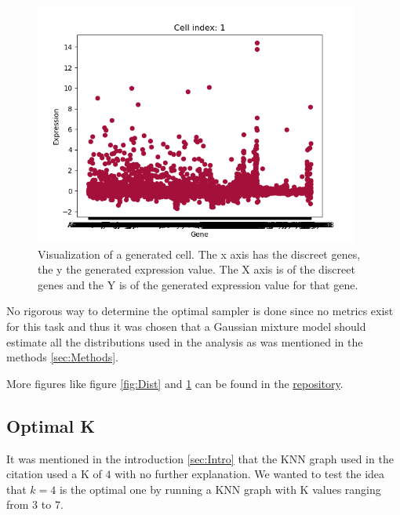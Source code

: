 \documentclass[12pt, a4paper]{article}
\begin{document}
                    \begin{figure}[H]
                        \begin{center}
                            \includegraphics[width=0.95\textwidth]{./outputs/Generator/Cells/Cell 1.png}
                        \end{center}
                        \caption{Visualization of a generated cell. The x axis has the discreet genes, the y the generated expression value. The X axis is of the discreet genes and the Y is of the generated expression value for that gene.}\label{fig:cells}
                    \end{figure}

                \begin{multicols}{2}

                No rigorous way to determine the optimal sampler is done since no metrics exist for this task and thus it was chosen that a Gaussian mixture model should estimate all the distributions used in the analysis as was mentioned in the methods \ref{sec:Methods}.
                \newline

                More figures like figure \ref{fig:Dist} and \ref{fig:cells} can be found in the \href{}{repository}.
                \newline


            \subsection{Optimal K} \label{sub:K}

                It was mentioned in the introduction \ref{sec:Intro} that the KNN graph used in the citation used a K of $4$ with no further explanation. We wanted to test the idea that $k=4$ is the optimal one by running a KNN graph with K values ranging from $3$ to $7$.
                \newline

                \end{multicols}
\end{document}
